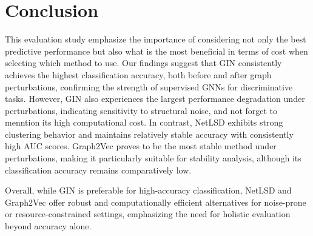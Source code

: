 \section{Conclusion}

This evaluation study emphasize the importance of considering 
not only the best predictive performance but also what is 
the most beneficial in terms of cost when selecting 
which method to use.
Our findings suggest that GIN consistently achieves the highest classification accuracy, 
both before and after graph perturbations, confirming the strength of supervised GNNs for discriminative tasks.
However, GIN also experiences the largest performance degradation under perturbations, indicating sensitivity to structural noise,
and not forget to menntion its high computational cost.
In contrast, NetLSD exhibits strong clustering behavior and maintains relatively stable accuracy with consistently high AUC scores.
Graph2Vec proves to be the most stable method under perturbations, 
making it particularly suitable for stability analysis, 
although its classification accuracy remains comparatively low.

Overall, while GIN is preferable for high-accuracy 
classification, NetLSD and Graph2Vec offer robust 
and computationally efficient alternatives for 
noise-prone or resource-constrained settings, 
emphasizing the need for holistic evaluation beyond accuracy alone.





